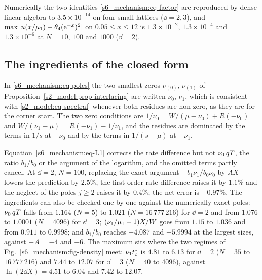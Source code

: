 Numerically the two identities \eqref{s6_mechanism:eq-factor} are reproduced by dense linear algebra to
$3.5\times10^{-14}$ on four small lattices ($\dd=2,3$), and $\max|u(x/\mu_{1})-\theta_4(\mathrm{e}^{-x})^{2}|$ on
$0.05\le x\le12$ is $1.3\times10^{-2}$, $1.3\times10^{-4}$ and $1.3\times10^{-6}$ at $N=10$, $100$ and $1000$ ($\dd=2$).

\subsection{The ingredients of the closed form}\label{sup_mechanism:ssec-ingredients}

In \eqref{s6_mechanism:eq-poles} the two smallest zeros $\nu_{(0)}$, $\nu_{(1)}$ of
Proposition~\ref{s2_model:prop-interlacing} are written $\nu_0$, $\nu_1$, which is consistent with
\eqref{s2_model:eq-spectral} whenever both residues are non-zero, as they are for the corner start. The two zero
conditions are $1/\nu_0=W/(\mu-\nu_0)+R(-\nu_0)$ and $W/(\nu_1-\mu)=R(-\nu_1)-1/\nu_1$, and the residues are dominated
by the terms in $1/s$ at $-\nu_0$ and by the terms in $1/(s+\mu)$ at $-\nu_1$.

Equation~\eqref{s6_mechanism:eq-L1} corrects the rate difference but not $\nu_0\,qT$, the ratio $b_1/b_0$ or the
argument of the logarithm, and the omitted terms partly cancel. At $\dd=2$, $N=100$, replacing the exact argument
$-b_1\nu_1/b_0\nu_0$ by $AX$ lowers the prediction by $2.5\%$, the first-order rate difference raises it by $1.1\%$ and
the neglect of the poles $j\ge2$ raises it by $0.4\%$; the net error is $-0.97\%$.
The ingredients can also be checked one by one against the numerically exact poles: $\nu_0\,qT$ falls from $1.164$
($N=5$) to $1.021$ ($N=16\,777\,216$) for $\dd=2$ and from $1.076$ to $1.0001$ ($N=4096$) for $\dd=3$; $(\nu_1/\mu_{1}-1)X/W$
goes from $1.15$ to $1.036$ and from $0.911$ to $0.9998$; and $b_1/b_0$ reaches $-4.087$ and $-5.9994$ at the largest
sizes, against $-A=-4$ and $-6$.
The maximum sits where the two regimes of Fig.~\ref{s6_mechanism:fig-density} meet: $\nu_1t^{*}_{\mathrm{c}}$ is $4.81$ to $6.13$ for
$\dd=2$ ($N=35$ to $16\,777\,216$) and $7.44$ to $12.07$ for $\dd=3$ ($N=40$ to $4096$), against $\ln(2\dd X)=4.51$ to $6.04$
and $7.42$ to $12.07$.

